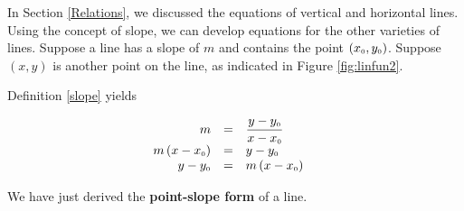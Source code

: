\smallskip

In Section \ref{Relations}, we discussed the equations of vertical and horizontal lines.  Using the concept of slope, we can develop equations for the other varieties of lines.  Suppose a line has a slope of $m$ and contains the point $\left(x_{\mbox{\tiny$0$}}, y_{\mbox{\tiny$0$}}\right)$.  Suppose $(x,y)$ is another point on the line, as indicated in Figure \ref{fig:linfun2}.


\pagebreak

Definition \ref{slope} yields

\setlength{\extrarowheight}{2pt}

\[ \begin{array}{rclr}  
                      m & = & \dfrac{y - y_{\mbox{\tiny$0$}}}{x-x_{\mbox{\tiny$0$}}} & \\
m\left(x - x_{\mbox{\tiny$0$}}\right) & = & y - y_{\mbox{\tiny$0$}} & \\ 
              y - y_{\mbox{\tiny$0$}} & = & m\left(x - x_{\mbox{\tiny$0$}}\right) & \\
   \end{array} \]

We have just derived the \textbf{point-slope form} of a line.


\smallskip


